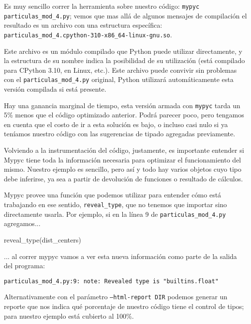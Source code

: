 Es muy sencillo correr la herramienta sobre nuestro código: \texttt{mypyc particulas\_mod\_4.py}; vemos que mas allá de algunos mensajes de compilación el resultado es un archivo con una estructura específica: \texttt{particulas\_mod\_4.cpython-310-x86\_64-linux-gnu.so}.

Este archivo es un módulo compilado que Python puede utilizar directamente, y la estructura de su nombre indica la posibilidad de su utilización (está compilado para CPython 3.10, en Linux, etc.). Este archivo puede convivir sin problemas con el \texttt{particulas\_mod\_4.py} original, Python utilizará automáticamente esta versión compilada si está presente.


Hay una ganancia marginal de tiempo, esta versión armada con \texttt{mypyc} tarda un 5\% menos que el código optimizado anterior. Podrá parecer poco, pero tengamos en cuenta que el costo de ir a esta solución es bajo, o incluso casi nulo si ya teníamos nuestro código con las sugerencias de tipado agregadas previamente.

Volviendo a la instrumentación del código, justamente, es importante entender si Mypyc tiene toda la información necesaria para optimizar el funcionamiento del mismo. Nuestro ejemplo es sencillo, pero así y todo hay varios objetos cuyo tipo debe inferirse, ya sea a partir de devolución de funciones o resultado de cálculos.

Mypyc provee una función que podemos utilizar para entender cómo está trabajando en ese sentido, \texttt{reveal\_type}, que no tenemos que importar sino directamente usarla. Por ejemplo, si en la línea 9 de \texttt{particulas\_mod\_4.py} agregamos...

\begin{py}
            reveal_type(dist_centers)
\end{py}

... al correr mypyc vamos a ver esta nueva información como parte de la salida del programa:

\begin{verbatim}
particulas_mod_4.py:9: note: Revealed type is "builtins.float"
\end{verbatim}

Alternativamente con el parámetro \texttt{--html-report DIR} podemos generar un reporte que nos indica qué porcentaje de nuestro código tiene el control de tipos; para nuestro ejemplo está cubierto al 100\%.

